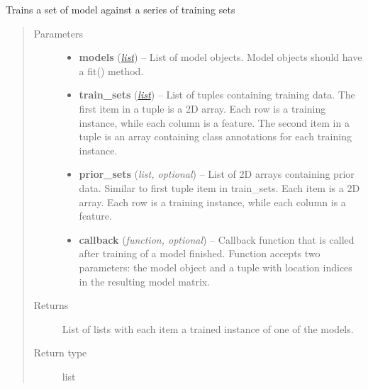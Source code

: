 \documentclass[letterpaper,10pt,english]{sphinxmanual}
\begin{document}
\begin{fulllineitems}
\label{classification:flamingo.classification.models.train_models}
Trains a set of model against a series of training sets
\begin{quote}\begin{description}
\item[{Parameters}] \leavevmode\begin{itemize}
\item {} 
\textbf{models} (\href{http://docs.python.org/library/functions.html\#list}{\emph{list}}) -- List of model objects. Model objects should have a fit() method.

\item {} 
\textbf{train\_sets} (\href{http://docs.python.org/library/functions.html\#list}{\emph{list}}) -- List of tuples containing training data. The first item in a
tuple is a 2D array. Each row is a training instance, while
each column is a feature. The second item in a tuple is an
array containing class annotations for each training instance.

\item {} 
\textbf{prior\_sets} (\emph{list, optional}) -- List of 2D arrays containing prior data. Similar to first
tuple item in train\_sets. Each item is a 2D array. Each row is
a training instance, while each column is a feature.

\item {} 
\textbf{callback} (\emph{function, optional}) -- Callback function that is called after training of a model
finished. Function accepts two parameters: the model object
and a tuple with location indices in the resulting model
matrix.

\end{itemize}

\item[{Returns}] \leavevmode
List of lists with each item a trained instance of one of the models.

\item[{Return type}] \leavevmode
list

\end{description}\end{quote}

\end{fulllineitems}
\end{document}
